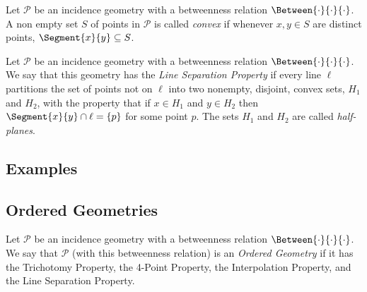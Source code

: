 \documentclass{article}
\begin{document}

\begin{dfn}[Convexity]
Let $\mathcal{P}$ be an incidence geometry with a betweenness relation $\Between{\cdot}{\cdot}{\cdot}$. A non empty set $S$ of points in $\mathcal{P}$ is called \emph{convex} if whenever $x,y \in S$ are distinct points, $\Segment{x}{y} \subseteq S$.
\end{dfn}

\begin{dfn}
Let $\mathcal{P}$ be an incidence geometry with a betweenness relation $\Between{\cdot}{\cdot}{\cdot}$. We say that this geometry has the \emph{Line Separation Property} if every line $\ell$ partitions the set of points not on $\ell$ into two nonempty, disjoint, convex sets, $H_1$ and $H_2$, with the property that if $x \in H_1$ and $y \in H_2$ then $\Segment{x}{y} \cap \ell = \{p\}$ for some point $p$. The sets $H_1$ and $H_2$ are called \emph{half-planes}.
\end{dfn}

\subsection*{Examples}

\subsection*{Ordered Geometries}

\begin{dfn}
Let $\mathcal{P}$ be an incidence geometry with a betweenness relation $\Between{\cdot}{\cdot}{\cdot}$. We say that $\mathcal{P}$ (with this betweenness relation) is an \emph{Ordered Geometry} if it has the Trichotomy Property, the 4-Point Property, the Interpolation Property, and the Line Separation Property.
\end{dfn}
\end{document}
